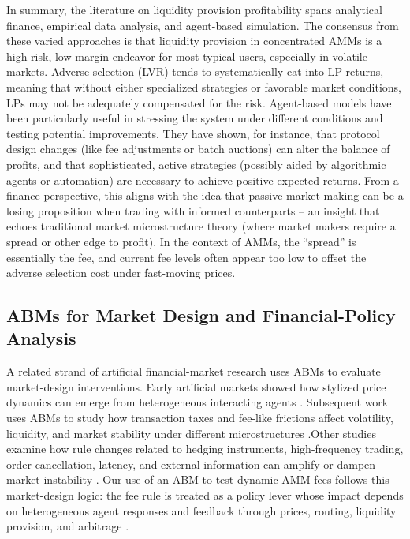 \documentclass[11pt]{article}
\begin{document}
In summary, the literature on liquidity provision profitability spans analytical finance, empirical data 
analysis, and agent-based simulation. The consensus from these varied approaches is that liquidity provision 
in concentrated AMMs is a high-risk, low-margin endeavor for most typical users, especially in volatile 
markets. Adverse selection (LVR) tends to systematically eat into LP returns, meaning that without either 
specialized strategies or favorable market conditions, LPs may not be adequately compensated for the risk. 
Agent-based models have been particularly useful in stressing the system under different conditions and 
testing potential improvements. They have shown, for instance, that protocol design changes (like fee 
adjustments or batch auctions) can alter the balance of profits, and that sophisticated, active strategies 
(possibly aided by algorithmic agents or automation) are necessary to achieve positive expected returns. 
From a finance perspective, this aligns with the idea that passive market-making can be a losing proposition 
when trading with informed counterparts – an insight that echoes traditional market microstructure theory 
(where market makers require a spread or other edge to profit). In the context of AMMs, the “spread” is 
essentially the fee, and current fee levels often appear too low to offset the adverse selection cost under 
fast-moving prices.

\subsection{ABMs for Market Design and Financial-Policy Analysis}
A related strand of artificial financial-market research uses ABMs to evaluate market-design interventions. 
Early artificial markets showed how stylized price dynamics can emerge from heterogeneous 
interacting agents \cite{raberto2001,chakraborti2011}. Subsequent work uses ABMs to study 
how transaction taxes and fee-like frictions affect volatility, liquidity, and market stability under 
different microstructures \cite{westerhoff2006,mannaro2008,pellizzari2009}.Other studies 
examine how rule changes related to hedging instruments, high-frequency trading, order cancellation, latency, 
and external information can amplify or dampen market instability \cite{brock2009,leal2016,carro2015,gao2024,
yagi2020}. Our use of an ABM to test dynamic AMM fees follows this market-design logic: the 
fee rule is treated as a policy lever whose impact depends on heterogeneous agent responses and feedback 
through prices, routing, liquidity provision, and arbitrage \cite{mizuta2020}.
\end{document}
